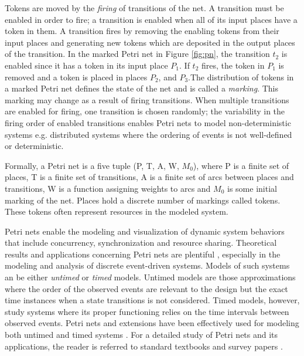 Tokens are moved by the \emph{firing} of transitions of the net. A transition
must be enabled in order to fire; a transition is enabled when all of its input
places have a token in them. A transition fires by removing the enabling tokens
from their input places and generating new tokens which are deposited in the
output places of the transition. In the marked Petri net in Figure \ref{fig:pn},
the transition $t_2$ is enabled since it has a token in its input place $P_1$.
If $t_2$ fires, the token in $P_1$ is removed and a token is placed in places
$P_2$, and $P_3$.The distribution of tokens in a marked Petri net defines the
state of the net and is called a \emph{marking}. This marking may change as a
result of firing transitions. When multiple transitions are enabled for firing,
one transition is chosen randomly; the variability in the firing order of
enabled transitions enables Petri nets to model non-deterministic systems e.g.
distributed systems where the ordering of events is not well-defined or
deterministic.

Formally, a Petri net is a five tuple (P, T, A, W, $M_0$), where P is a finite
set of places, T is a finite set of transitions, A is a finite set of arcs
between places and transitions, W is a function assigning weights to arcs and
$M_0$ is some initial marking of the net. Places hold a discrete number of
markings called tokens. These tokens often represent resources in the modeled
system.

Petri nets enable the modeling and visualization of dynamic system behaviors
that include concurrency, synchronization and resource sharing. Theoretical
results and applications concerning Petri nets are plentiful
\cite{david1994petri, holloway1997survey}, especially in the modeling and
analysis of discrete event-driven systems. Models of such systems an be either
\emph{untimed} or \emph{timed} models. Untimed models are those approximations
where the order of the observed events are relevant to the design but the exact
time instances when a state transitions is not considered. Timed models,
however, study systems where its proper functioning relies on the time intervals
between observed events. Petri nets and extensions have been effectively used
for modeling both untimed \cite{holloway1997survey} and timed systems
\cite{zuberek1991timed}. For a detailed study of Petri nets and its
applications, the reader is referred to standard textbooks
\cite{peterson1977petri, reisig2012petri} and survey papers
\cite{murata1989petri, zhou1999modeling, zurawski1994petri}.

